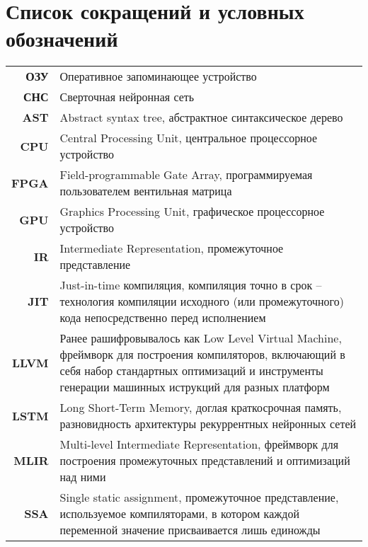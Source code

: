 \clearpage

\begingroup
{}
{}  %
\section*{Список сокращений и условных обозначений}
\noindent

\addtocounter{table}{-1}%
\begin{longtabu} to \textwidth {r X}
\textbf{ОЗУ} & Оперативное запоминающее устройство \\
\textbf{СНС} & Сверточная нейронная сеть \\
\textbf{AST} & Abstract syntax tree, абстрактное синтаксическое дерево \\
\textbf{CPU} & Central Processing Unit, центральное процессорное устройство \\
\textbf{FPGA} & Field-programmable Gate Array, программируемая пользователем
вентильная матрица \\
\textbf{GPU} & Graphics Processing Unit, графическое процессорное устройство \\
\textbf{IR} & Intermediate Representation, промежуточное представление \\
\textbf{JIT} & Just-in-time компиляция, компиляция точно в срок -- технология
компиляции исходного (или промежуточного) кода непосредственно перед исполнением \\
\textbf{LLVM} & Ранее рашифровывалось как Low Level Virtual Machine, фреймворк 
для построения компиляторов, включающий в себя набор стандартных оптимизаций и 
инструменты генерации машинных иструкций для разных платформ \\
\textbf{LSTM} & Long Short-Term Memory, доглая краткосрочная память,
разновидность архитектуры рекуррентных нейронных сетей \\
\textbf{MLIR} & Multi-level Intermediate Representation, фреймворк для построения
промежуточных представлений и оптимизаций над ними \\
\textbf{SSA} & Single static assignment, промежуточное представление,
используемое компиляторами, в котором каждой переменной значение присваивается
лишь единожды \\
\end{longtabu}
